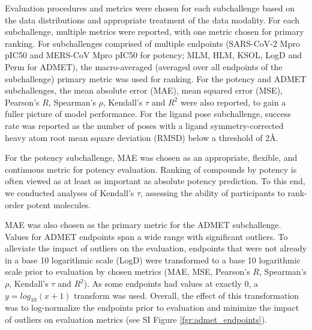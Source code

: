 \documentclass[journal=jcim,manuscript=article]{achemso}
\begin{document}
Evaluation procedures and metrics were chosen for each subchallenge based on the data distributions and appropriate treatment of the data modality. For each subchallenge, multiple metrics were reported, with one metric chosen for primary ranking. For subchallenges comprised of multiple endpoints (SARS-CoV-2 Mpro pIC50 and MERS-CoV Mpro pIC50 for potency; MLM, HLM, KSOL, LogD and Perm for ADMET), the macro-averaged (averaged over all endpoints of the subchallenge) primary metric was used for ranking. For the potency and ADMET subchallenges, the mean absolute error (MAE), mean squared error (MSE), Pearson's $R$, Spearman's $\rho$, Kendall's $\tau$ and $R^2$ were also reported, to gain a fuller picture of model performance. For the ligand pose subchallenge, success rate was reported as the number of poses with a ligand symmetry-corrected heavy atom root mean square deviation (RMSD) below a threshold of 2Å.

For the potency subchallenge, MAE was chosen as an appropriate, flexible, and continuous metric for potency evaluation. Ranking of compounds by potency is often viewed as at least as important as absolute potency prediction\cite{parks_gaieb_chiu_yang_shao_walters_jansen_mcgaughey_lewis_bembenek_et}. To this end, we conducted analyses of Kendall's $\tau$, assessing the ability of participants to rank-order potent molecules. 

 MAE was also chosen as the primary metric for the ADMET subchallenge. Values for ADMET endpoints span a wide range with significant outliers. To alleviate the impact of outliers on the evaluation, endpoints that were not already in a base 10 logarithmic scale (LogD) were transformed to a base 10 logarithmic scale prior to evaluation by chosen metrics (MAE, MSE, Pearson's $R$, Spearman's $\rho$, Kendall's $\tau$ and $R^2$). As some endpoints had values at exactly 0, a $ y=log_{10}(x + 1)$ transform was used. Overall, the effect of this transformation was to log-normalize the endpoints prior to evaluation and minimize the impact of outliers on evaluation metrics (see SI Figure \ref{fgr:admet_endpoints}).
\end{document}
